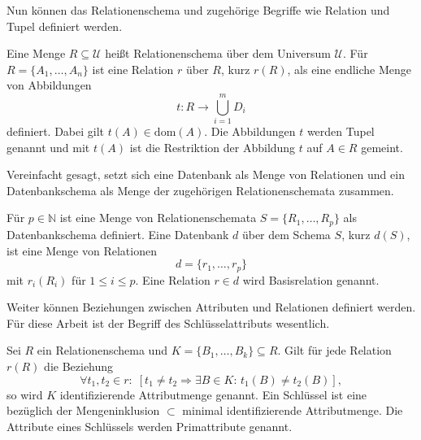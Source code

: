 Nun können das Relationenschema und zugehörige Begriffe wie Relation und Tupel definiert werden.

\begin{defi}
    \label{def:relation}
    Eine Menge $R \subseteq \mathcal{U}$ heißt Relationenschema über dem Universum $\mathcal{U}$. Für $R=\{A_1, \ldots, A_n \}$ ist eine Relation $r$ über $R$, kurz $r(R)$, als eine endliche Menge von Abbildungen
    \begin{equation*}
        t:R \rightarrow \bigcup_{i=1}^m D_i
    \end{equation*}
    definiert. Dabei gilt $t(A) \in \mathrm{dom}(A)$. Die Abbildungen $t$ werden Tupel genannt und mit $t(A)$ ist die Restriktion der Abbildung $t$ auf $A \in R$ gemeint.
\end{defi}

Vereinfacht gesagt, setzt sich eine Datenbank als Menge von Relationen und ein Datenbankschema als Menge der zugehörigen Relationenschemata zusammen.

\begin{defi}
    Für $p \in \mathbb{N}$ ist eine Menge von Relationenschemata $S=\{R_1, \ldots, R_p\}$ als Datenbankschema definiert. Eine Datenbank $d$ über dem Schema $S$, kurz $d(S)$, ist eine Menge von Relationen
    \begin{equation*}
        d=\{r_1, \ldots, r_p \}
    \end{equation*}
    mit $r_i(R_i)$ für $1 \leq i \leq p$. Eine Relation $r \in d$ wird Basisrelation genannt.
\end{defi}

Weiter können Beziehungen zwischen Attributen und Relationen definiert werden. Für diese Arbeit ist der Begriff des Schlüsselattributs wesentlich.

\begin{defi}[Schlüssel]
    Sei $R$ ein Relationenschema und $K=\{B_1, \ldots, B_k\} \subseteq R$. Gilt für jede Relation $r(R)$ die Beziehung
    \begin{equation*}
         \forall t_1, t_2 \in r: \; [ t_1 \neq t_2 \Rightarrow \exists B \in K: \, t_1(B) \neq t_2(B)],
    \end{equation*}
    so wird $K$ identifizierende Attributmenge genannt. Ein Schlüssel ist eine bezüglich der Mengeninklusion $\subset$ minimal identifizierende Attributmenge. Die Attribute eines Schlüssels werden Primattribute genannt.
\end{defi}

